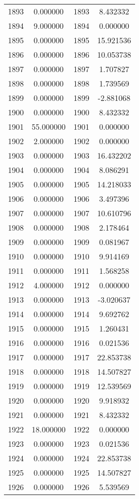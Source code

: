 \documentclass[12pt]{article}
\begin{document}
\begin{longtable}{@{}cccc@{}}
1893 & 0.000000 & 1893 & 8.432332 \\
1894 & 9.000000 & 1894 & 0.000000 \\
1895 & 0.000000 & 1895 & 15.921536 \\
1896 & 0.000000 & 1896 & 10.053738 \\
1897 & 0.000000 & 1897 & 1.707827 \\
1898 & 0.000000 & 1898 & 1.739569 \\
1899 & 0.000000 & 1899 & -2.881068 \\
1900 & 0.000000 & 1900 & 8.432332 \\
1901 & 55.000000 & 1901 & 0.000000 \\
1902 & 2.000000 & 1902 & 0.000000 \\
1903 & 0.000000 & 1903 & 16.432202 \\
1904 & 0.000000 & 1904 & 8.086291 \\
1905 & 0.000000 & 1905 & 14.218033 \\
1906 & 0.000000 & 1906 & 3.497396 \\
1907 & 0.000000 & 1907 & 10.610796 \\
1908 & 0.000000 & 1908 & 2.178464 \\
1909 & 0.000000 & 1909 & 0.081967 \\
1910 & 0.000000 & 1910 & 9.914169 \\
1911 & 0.000000 & 1911 & 1.568258 \\
1912 & 4.000000 & 1912 & 0.000000 \\
1913 & 0.000000 & 1913 & -3.020637 \\
1914 & 0.000000 & 1914 & 9.692762 \\
1915 & 0.000000 & 1915 & 1.260431 \\
1916 & 0.000000 & 1916 & 0.021536 \\
1917 & 0.000000 & 1917 & 22.853738 \\
1918 & 0.000000 & 1918 & 14.507827 \\
1919 & 0.000000 & 1919 & 12.539569 \\
1920 & 0.000000 & 1920 & 9.918932 \\
1921 & 0.000000 & 1921 & 8.432332 \\
1922 & 18.000000 & 1922 & 0.000000 \\
1923 & 0.000000 & 1923 & 0.021536 \\
1924 & 0.000000 & 1924 & 22.853738 \\
1925 & 0.000000 & 1925 & 14.507827 \\
1926 & 0.000000 & 1926 & 5.539569 \\

\end{longtable}
\end{document}
